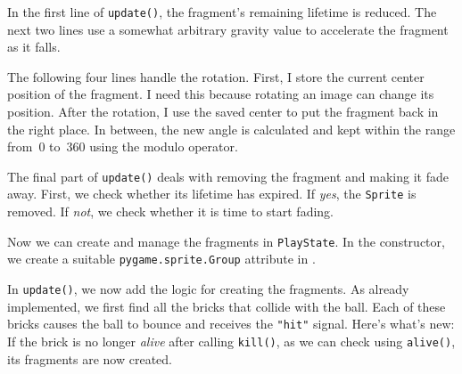 
\begin{figure}%
	\begin{center}%
		\vspace{-6ex}%
	\end{center}%
\end{figure}%
In the first line of \texttt{update()}, the fragment's remaining lifetime is reduced. The next two lines use a somewhat arbitrary gravity value to accelerate the fragment as it falls.

The following four lines handle the rotation. First, I store the current center position of the fragment. I need this because rotating an image can change its position. After the rotation, I use the saved center to put the fragment back in the right place. In between, the new angle is calculated and kept within the range from~$0$ to~$360$ using the modulo operator.

The final part of \texttt{update()} deals with removing the fragment and making it fade away. First, we check whether its lifetime has expired. If \emph{yes}, the \texttt{Sprite} is removed. If \emph{not}, we check whether it is time to start fading.


Now we can create and manage the fragments in \texttt{PlayState}. In the constructor, we create a suitable \texttt{pygame.sprite.Group} attribute in .


In \texttt{update()}, we now add the logic for creating the fragments. As already implemented, we first find all the bricks that collide with the ball. Each of these bricks causes the ball to bounce and receives the \verb="hit"= signal.
Here's what's new: If the brick is no longer \emph{alive} after calling \texttt{kill()}, as we can check using \texttt{alive()}, its fragments are now created.


